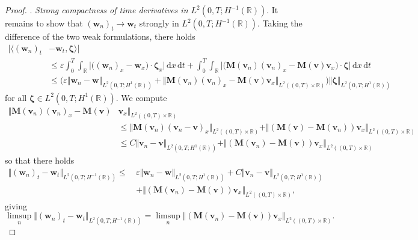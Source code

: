 \documentclass[11pt,a4paper,reqno]{amsart}
\numberwithin{equation}{section}
\theoremstyle{definition}
\theoremstyle{remark}
\newcommand{\bv}{\mathbf{v}}
\newcommand{\bw}{\mathbf{w}}
\renewcommand{\d}{\, \mathrm{d}}
\newcommand{\bM}{\mathbf{M}}
\newcommand{\bzeta}{\boldsymbol{\zeta}}
\renewcommand{\leq}{\leqslant}
\begin{document}
{\begin{proof}
\smallskip 
{}. \textit{Strong compactness of time derivatives in $L^2(0,T;H^{-1}(\mathbb{R}))$}. It remains to show that $(\bw_n)_t \to \bw_t$ strongly in $L^2(0,T;H^{-1}(\mathbb{R}))$. Taking the difference of the two weak formulations, there holds 
\begin{equation*}
    \begin{aligned}
        |\langle (\bw_n)_t \! & - \! \bw_t , \bzeta \rangle| \\ 
        &\leq \varepsilon \int_0^T \int_\mathbb{R} \big| \big( (\bw_n)_x \! -\! \bw_x \big) \cdot \bzeta_x \big| \d x \d t + \int_0^T \int_\mathbb{R} \big| \big(\bM(\bv_n)(\bv_n)_x \! -\! \bM(\bv)\bv_x \big) \! \cdot \! \bzeta \big| \d x \d t \\ 
        &\leq \Big(\varepsilon \Vert \bw_n \! - \! \bw \Vert_{L^2(0,T;H^1(\mathbb{R}))} \!+\! \Vert \bM(\bv_n)(\bv_n)_x \!-\! \bM(\bv)\bv_x
 \Vert_{L^2((0,T)\times\mathbb{R})}\Big)\Vert \bzeta \Vert_{L^2(0,T;H^1(\mathbb{R}))}
    \end{aligned}
\end{equation*}
for all $\bzeta \in L^2(0,T;H^1(\mathbb{R}))$. We compute 
\begin{equation*}
    \begin{aligned}
        \Vert \bM(\bv_n)(\bv_n)_x - \bM(\bv)&\bv_x
 \Vert_{L^2((0,T)\times\mathbb{R})} \\ &\leq \Vert \bM(\bv_n)(\bv_n - \bv)_x \Vert_{L^2((0,T)\times\mathbb{R})} + \Vert (\bM(\bv) - \bM(\bv_n))\bv_x
 \Vert_{L^2((0,T)\times\mathbb{R})} \\ 
 &\leq C \Vert \bv_n \! - \! \bv \Vert_{L^2(0,T;H^1(\mathbb{R}))} + \Vert (\bM(\bv_n)\! -\! \bM(\bv) ) \bv_x\Vert_{L^2((0,T)\times\mathbb{R})}
    \end{aligned}
\end{equation*}
so that there holds 
\begin{equation*}
    \begin{aligned}
        \Vert (\bw_n)_t - \bw_t \Vert_{L^2(0,T;H^{-1}(\mathbb{R}))} \leq \, & \varepsilon \Vert \bw_n - \bw \Vert_{L^2(0,T;H^1(\mathbb{R}))} + C\Vert \bv_n - \bv \Vert_{L^2(0,T;H^1(\mathbb{R}))} \\ 
        &+ \Vert (\bM(\bv_n)\! -\! \bM(\bv) ) \bv_x\Vert_{L^2((0,T)\times\mathbb{R})}, 
    \end{aligned}
\end{equation*}
giving
\begin{equation*}
    \limsup_n  \Vert (\bw_n)_t - \bw_t \Vert_{L^2(0,T;H^{-1}(\mathbb{R}))} = \limsup_n \Vert (\bM(\bv_n)\! -\! \bM(\bv) ) \bv_x\Vert_{L^2((0,T)\times\mathbb{R})}. 

\end{equation*}
\end{proof}}
\end{document}
